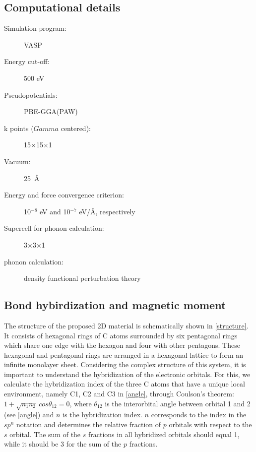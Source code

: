 \subsection{Computational details}
\begin{footnotesize}
\begin{description}
\item[Simulation program:] VASP
\item[Energy cut-off:] 500 eV
\item[Pseudopotentials:] PBE-GGA(PAW)
\item[k points ($Gamma$ centered):] 15$\times$15$\times$1
\item[Vacuum:] 25~\AA
\item[Energy and force convergence criterion:] 10$^{-8}$ eV and 10$^{-7}$ eV/\AA, respectively
\item[Supercell for phonon calculation:] 3$\times$3$\times$1
\item[phonon calculation:] density functional perturbation theory
\end{description}
\end{footnotesize}

\subsection{Bond hybirdization and magnetic moment \label{res}}

The structure of the proposed 2D material is schematically shown in \autoref{structure}. It consists of hexagonal rings of C atoms surrounded by six pentagonal rings which share one edge with the hexagon and four with other pentagons. These hexagonal and pentagonal rings are arranged in a hexagonal lattice to form an infinite monolayer sheet. Considering the complex structure of this system, it is important to understand the hybridization of the electronic orbitals. For this, we calculate the hybridization index of the three C atoms that have a unique local environment, namely C1, C2 and C3 in \autoref{angle}, through Coulson's theorem: $1+\sqrt{n_1n_2}~cos\theta_{12}=0$, where $\theta_{12}$ is the interorbital angle between orbital 1 and 2 (see \autoref{angle}) and $n$ is the hybridization index.  $n$ corresponds to the index in the $sp^n$ notation and determines the relative fraction of $p$ orbitals with respect to the $s$ orbital. The sum of the $s$ fractions in all hybridized orbitals should equal 1, while it should be 3 for the sum of the $p$ fractions. 

